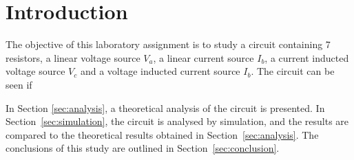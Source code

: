 \section{Introduction}
\label{sec:introduction}

The objective of this laboratory assignment is to study a circuit containing 7 resistors, a linear voltage source $V_a$, a linear current source $I_b$, a current inducted voltage source $V_c$ and a voltage inducted current source $I_b$. The circuit can be seen if %


In Section \ref{sec:analysis}, a theoretical analysis of the circuit is
presented. In Section~\ref{sec:simulation}, the circuit is analysed by
simulation, and the results are compared to the theoretical results obtained in
Section~\ref{sec:analysis}. The conclusions of this study are outlined in
Section~\ref{sec:conclusion}.








